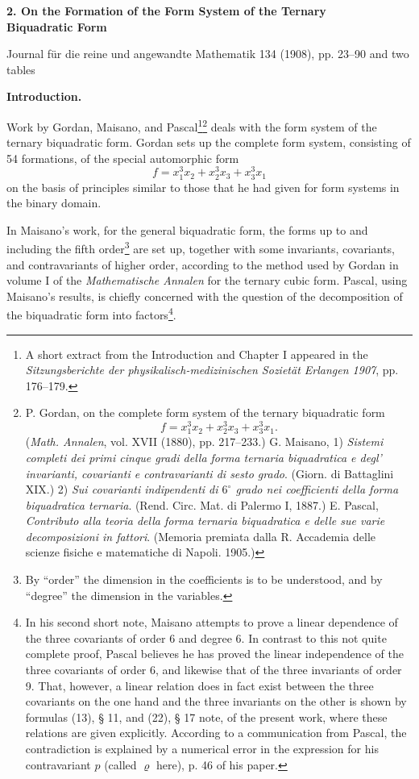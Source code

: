 \documentclass[11pt]{article}
\begin{document}
\begin{center}
{\Large\bfseries 2. On the Formation of the Form System of the Ternary\\ Biquadratic Form}\par
\vspace{1.5em}
Journal für die reine und angewandte Mathematik 134 (1908), pp. 23--90 and two tables
\end{center}

\vspace{3em}

\begin{center}
\textbf{Introduction.}
\end{center}

Work by Gordan, Maisano, and Pascal\footnote{A short extract from the Introduction and Chapter I appeared in the \emph{Sitzungsberichte der physikalisch-medizinischen Sozietät Erlangen 1907}, pp. 176--179.}\footnote{P. Gordan, on the complete form system of the ternary biquadratic form
\[
f=x_1^3x_2+x_2^3x_3+x_3^3x_1.
\]
(\emph{Math. Annalen}, vol. XVII (1880), pp. 217--233.)
G. Maisano, 1) \emph{Sistemi completi dei primi cinque gradi della forma ternaria biquadratica e degl' invarianti, covarianti e contravarianti di sesto grado}. (Giorn. di Battaglini XIX.)
2) \emph{Sui covarianti indipendenti di $6^\circ$ grado nei coefficienti della forma biquadratica ternaria}. (Rend. Circ. Mat. di Palermo I, 1887.)
E. Pascal, \emph{Contributo alla teoria della forma ternaria biquadratica e delle sue varie decomposizioni in fattori}. (Memoria premiata dalla R. Accademia delle scienze fisiche e matematiche di Napoli. 1905.)} deals with the form system of the ternary biquadratic form. Gordan sets up the complete form system, consisting of 54 formations, of the special automorphic form
\[
f=x_1^3x_2+x_2^3x_3+x_3^3x_1
\]
on the basis of principles similar to those that he had given for form systems in the binary domain.

In Maisano's work, for the general biquadratic form, the forms up to and including the fifth order\footnote{By ``order'' the dimension in the coefficients is to be understood, and by ``degree'' the dimension in the variables.} are set up, together with some invariants, covariants, and contravariants of higher order, according to the method used by Gordan in volume I of the \emph{Mathematische Annalen} for the ternary cubic form. Pascal, using Maisano's results, is chiefly concerned with the question of the decomposition of the biquadratic form into factors\footnote{In his second short note, Maisano attempts to prove a linear dependence of the three covariants of order 6 and degree 6. In contrast to this not quite complete proof, Pascal believes he has proved the linear independence of the three covariants of order 6, and likewise that of the three invariants of order 9. That, however, a linear relation does in fact exist between the three covariants on the one hand and the three invariants on the other is shown by formulas (13), § 11, and (22), § 17 note, of the present work, where these relations are given explicitly. According to a communication from Pascal, the contradiction is explained by a numerical error in the expression for his contravariant $p$ (called $\varrho$ here), p. 46 of his paper.}.
\end{document}
